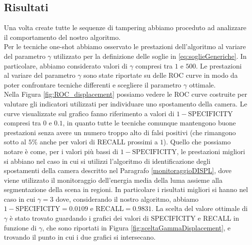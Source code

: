 \subsection{Risultati}
Una volta create tutte le sequenze di tampering abbiamo proceduto ad analizzare il comportamento del nostro algoritmo.\\
Per le tecniche one-shot abbiamo osservato le prestazioni dell'algoritmo al variare del parametro $\gamma$ utilizzato per la definizione delle soglie in \eqref{eq:soglieGeneriche}.
In particolare, abbiamo considerato valori di $\gamma$ compresi tra $1$ e $500$.
Le prestazioni al variare del parametro $\gamma$ sono state riportate su delle ROC curve in modo da poter confrontare tecniche differenti e scegliere il parametro $\gamma$ ottimale.\\ 
Nella Figura \ref{fig:ROC_displacement} possiamo vedere le ROC curve costruite per valutare gli indicatori utilizzati per individuare uno spostamento della camera.
Le curve visualizzate sul grafico fanno riferimento a valori di $1-\text{SPECIFICITY}$ compresi tra $0$ e $0.1$, in quanto tutte le tecniche comunque mantengono buone prestazioni senza avere un numero troppo alto di falsi positivi (che rimangono sotto al $5\%$ anche per valori di RECALL prossimi a $1$).
Quello che possiamo notare \`e come, per i valori pi\`u bassi di $1-\text{SPECIFICITY}$, le prestazioni migliori si abbiano nel caso in cui si utilizzi l'algoritmo di identificazione degli spostamenti della camera descritto nel Paragrafo \ref{monitoraggioDISPL}, dove viene utilizzato il monitoraggio dell'energia media della luma assieme alla segmentazione della scena in regioni.
In particolare i risultati migliori si hanno nel caso in cui $\gamma = 3$ dove, considerando il nostro algoritmo, abbiamo $1-\text{SPECIFICITY}=0.0109$ e $\text{RECALL} = 0.9831$.
La scelta del valore ottimale di $\gamma$ \`e stato trovato guardando i grafici dei valori di SPECIFICITY e RECALL in funzione di $\gamma$, che sono riportati in Figura \ref{fig:sceltaGammaDisplacement}, e trovando il punto in cui i due grafici si intersecano.\\
